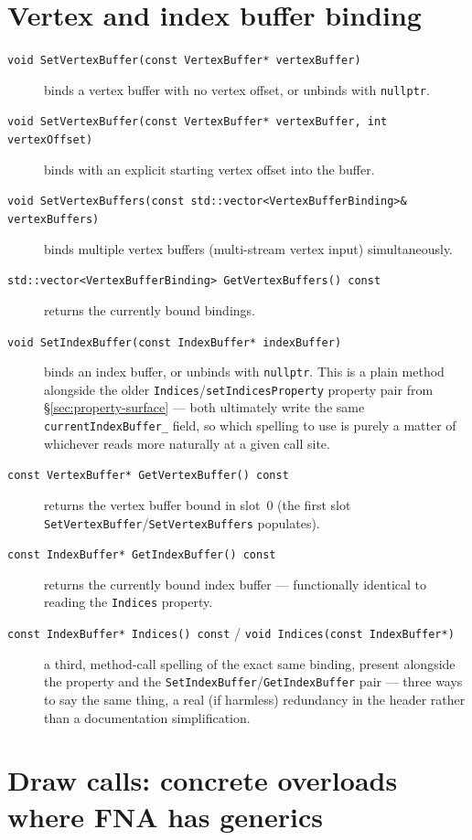 \section{Vertex and index buffer binding}
\label{sec:vertex-index-binding}

\begin{description}
\item[\texttt{void SetVertexBuffer(const VertexBuffer* vertexBuffer)}] binds a vertex buffer
  with no vertex offset, or unbinds with \texttt{nullptr}.
\item[\texttt{void SetVertexBuffer(const VertexBuffer* vertexBuffer, int vertexOffset)}] binds
  with an explicit starting vertex offset into the buffer.
\item[\texttt{void SetVertexBuffers(const std::vector<VertexBufferBinding>\& vertexBuffers)}]
  binds multiple vertex buffers (multi-stream vertex input) simultaneously.
\item[\texttt{std::vector<VertexBufferBinding> GetVertexBuffers() const}] returns the currently
  bound bindings.
\item[\texttt{void SetIndexBuffer(const IndexBuffer* indexBuffer)}] binds an index buffer, or
  unbinds with \texttt{nullptr}. This is a plain method alongside the older
  \texttt{Indices}/\texttt{setIndicesProperty} property pair from
  \S\ref{sec:property-surface} --- both ultimately write the same
  \texttt{currentIndexBuffer\_} field, so which spelling to use is purely a matter of whichever
  reads more naturally at a given call site.
\item[\texttt{const VertexBuffer* GetVertexBuffer() const}] returns the vertex buffer bound in
  slot~0 (the first slot \texttt{SetVertexBuffer}/\texttt{SetVertexBuffers} populates).
\item[\texttt{const IndexBuffer* GetIndexBuffer() const}] returns the currently bound index
  buffer --- functionally identical to reading the \texttt{Indices} property.
\item[\texttt{const IndexBuffer* Indices() const} / \texttt{void Indices(const IndexBuffer*)}]
  a third, method-call spelling of the exact same binding, present alongside the property and
  the \texttt{SetIndexBuffer}/\texttt{GetIndexBuffer} pair --- three ways to say the same thing,
  a real (if harmless) redundancy in the header rather than a documentation simplification.
\end{description}

\section{Draw calls: concrete overloads where FNA has generics}
\label{sec:draw-calls}

